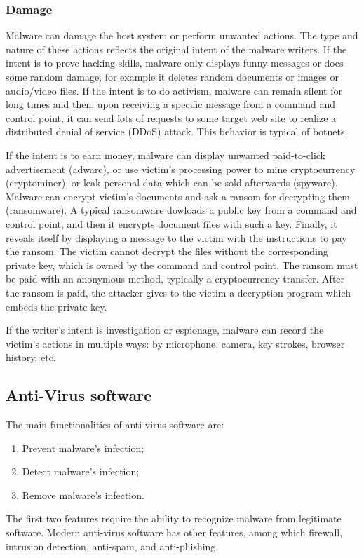 \documentclass[a4paper,12pt]{article}
\begin{document}
\subsubsection{Damage}
Malware can damage the host system or perform unwanted actions. The type and nature of these actions reflects the original intent of the malware writers. If the intent is to prove hacking skills, malware only displays funny messages or does some random damage, for example it deletes random documents or images or audio/video files. If the intent is to do activism, malware can remain silent for long times and then, upon receiving a specific message from a command and control point, it can send lots of requests to some target web site to realize a distributed denial of service (DDoS) attack. This behavior is typical of botnets.

If the intent is to earn money, malware can display unwanted paid-to-click advertisement (adware), or use victim’s processing power to mine cryptocurrency (cryptominer), or leak personal data which can be sold afterwards (spyware). Malware can encrypt victim’s documents and ask a ransom for decrypting them (ransomware). A typical ransomware dowloads a public key from a command and control point, and then it encrypts document files with such a key. Finally, it reveals itself by displaying a message to the victim with the instructions to pay the ransom. The victim cannot decrypt the files without the corresponding private key, which is owned by the command and control point. The ransom must be paid with an anonymous method, typically a cryptocurrency transfer. After the ransom is paid, the attacker gives to the victim a decryption program which embeds the private key.

If the writer’s intent is investigation or espionage, malware can record the victim’s actions in multiple ways: by microphone, camera, key strokes, browser history, etc.

\subsection{Anti-Virus software}
The main functionalities of anti-virus software are: 
\begin{enumerate}
	\item Prevent malware's infection;
	\item Detect malware's infection;
	\item Remove malware's infection.
\end{enumerate}
The first two features require the ability to recognize malware from legitimate software. Modern anti-virus software has other features, among which firewall, intrusion detection, anti-spam, and anti-phishing.
\end{document}

